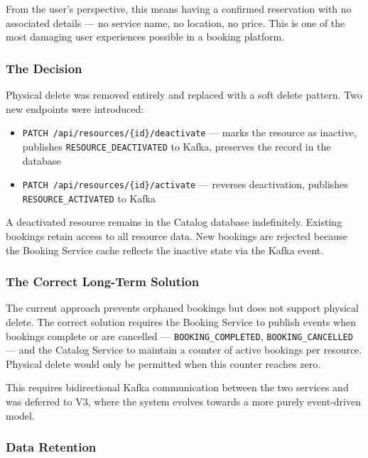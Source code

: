 From the user's perspective, this means having a confirmed reservation with no associated details --- no service name, no location, no price. This is one of the most damaging user experiences possible in a booking platform.

\subsubsection{The Decision}

Physical delete was removed entirely and replaced with a soft delete pattern. Two new endpoints were introduced:

\begin{itemize}
    \item \texttt{PATCH /api/resources/\{id\}/deactivate} --- marks the resource as inactive, publishes \texttt{RESOURCE\_DEACTIVATED} to Kafka, preserves the record in the database
    \item \texttt{PATCH /api/resources/\{id\}/activate} --- reverses deactivation, publishes \texttt{RESOURCE\_ACTIVATED} to Kafka
\end{itemize}

A deactivated resource remains in the Catalog database indefinitely. Existing bookings retain access to all resource data. New bookings are rejected because the Booking Service cache reflects the inactive state via the Kafka event.

\subsubsection{The Correct Long-Term Solution}

The current approach prevents orphaned bookings but does not support physical delete. The correct solution requires the Booking Service to publish events when bookings complete or are cancelled --- \texttt{BOOKING\_COMPLETED}, \texttt{BOOKING\_CANCELLED} --- and the Catalog Service to maintain a counter of active bookings per resource. Physical delete would only be permitted when this counter reaches zero.

This requires bidirectional Kafka communication between the two services and was deferred to V3, where the system evolves towards a more purely event-driven model.

\subsubsection{Data Retention}

